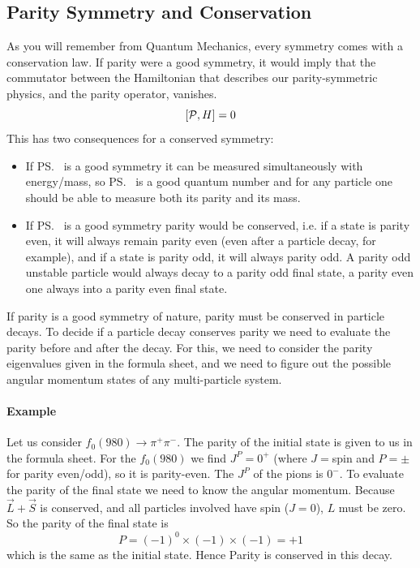 \subsection{Parity Symmetry and Conservation}
 As you will remember from Quantum Mechanics, every symmetry comes
 with a conservation law. If parity were a good symmetry, it would
 imply that the commutator between the Hamiltonian that describes our
 parity-symmetric physics, and the parity operator, vanishes.
\begin{equation}
 \left[\mathcal{P}, H\right] = 0
\end{equation}
 This has two consequences for a conserved symmetry:
\begin{itemize}
 \item If \ps\ is a good symmetry it can be measured simultaneously
   with energy/mass, so \ps\ is a good quantum number and for any
   particle one should be able to measure both its parity and its mass.
 \item If \ps\ is a good symmetry parity would be conserved, i.e. if a state is
 parity even, it will always remain parity even (even after a particle decay, for example), and if a state is parity odd, it will always parity
 odd. A parity odd unstable particle would always decay to a parity
 odd final state, a parity even one always into a parity even final
 state.
\end{itemize}

If parity is a good symmetry of nature, parity must be conserved in particle decays. To decide if a particle decay conserves parity we need to evaluate the parity before and after the decay. For this, we need to consider the parity eigenvalues given in the formula sheet, and we need to figure out the possible angular momentum states of any multi-particle system.

\paragraph{Example}
Let us consider $f_0(980) \to \pi^+ \pi^-$. The parity of the initial state is given to us in the formula sheet. For the $f_0(980)$ we find $J^P = 0^+$ (where $J=$spin and $P = \pm$ for parity even/odd), so it is parity-even. The $J^P$ of the pions is $0^-$. 
To evaluate the parity of the final state we need to know the angular momentum. Because $\vec{L}+\vec{S}$ is conserved, and all particles involved have spin ($J=0$), $L$ must be zero. So the parity of the final state is
\[
P = (-1)^{0} \times (-1) \times (-1) = +1
\]
which is the same as the initial state. Hence Parity is conserved in this decay.

